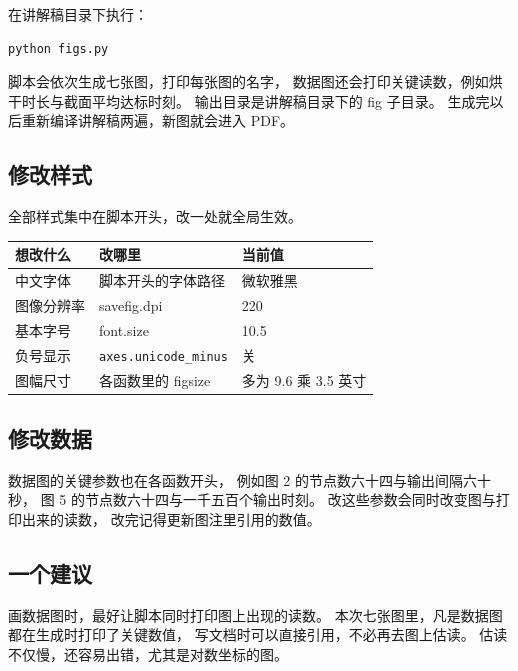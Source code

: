 \documentclass[11pt,a4paper]{article}
\begin{document}
在讲解稿目录下执行：

\begin{lstlisting}
python figs.py
\end{lstlisting}

脚本会依次生成七张图，打印每张图的名字，
数据图还会打印关键读数，例如烘干时长与截面平均达标时刻。
输出目录是讲解稿目录下的 fig 子目录。
生成完以后重新编译讲解稿两遍，新图就会进入 PDF。

\subsection{修改样式}

全部样式集中在脚本开头，改一处就全局生效。

\begin{center}
\begin{tabular}{@{}lll@{}}
\toprule
想改什么 & 改哪里 & 当前值 \\
\midrule
中文字体 & 脚本开头的字体路径 & 微软雅黑 \\
图像分辨率 & savefig.dpi & 220 \\
基本字号 & font.size & 10.5 \\
负号显示 & \texttt{axes.unicode\_minus} & 关 \\
图幅尺寸 & 各函数里的 figsize & 多为 9.6 乘 3.5 英寸 \\
\bottomrule
\end{tabular}
\end{center}

\subsection{修改数据}

数据图的关键参数也在各函数开头，
例如图 2 的节点数六十四与输出间隔六十秒，
图 5 的节点数六十四与一千五百个输出时刻。
改这些参数会同时改变图与打印出来的读数，
改完记得更新图注里引用的数值。

\subsection{一个建议}

画数据图时，最好让脚本同时打印图上出现的读数。
本次七张图里，凡是数据图都在生成时打印了关键数值，
写文档时可以直接引用，不必再去图上估读。
估读不仅慢，还容易出错，尤其是对数坐标的图。
\end{document}
